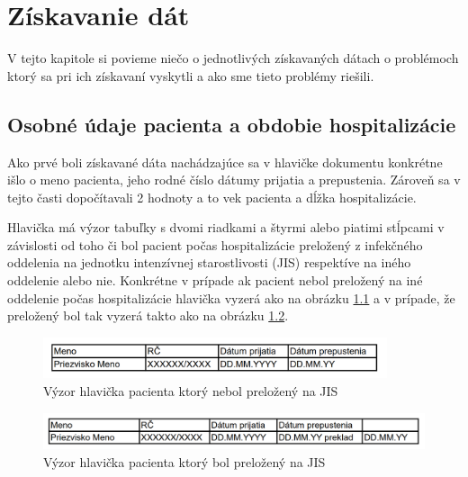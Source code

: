 \chapter{Získavanie dát}

V tejto kapitole si povieme niečo o jednotlivých získavaných dátach o problémoch ktorý sa pri ich získavaní vyskytli a ako sme tieto problémy riešili.

\section{Osobné údaje pacienta a obdobie hospitalizácie}

Ako prvé boli získavané dáta nachádzajúce sa v hlavičke dokumentu konkrétne išlo o meno pacienta, jeho rodné číslo dátumy prijatia a prepustenia. Zároveň sa v tejto časti dopočítavali 2 hodnoty a to vek pacienta a dĺžka hospitalizácie.

Hlavička má výzor tabuľky s dvomi riadkami a štyrmi alebo piatimi stĺpcami v závislosti od toho či bol pacient počas hospitalizácie preložený z infekčného oddelenia na jednotku intenzívnej starostlivosti (JIS) respektíve na iného oddelenie alebo nie. Konkrétne v prípade ak pacient nebol preložený na iné oddelenie počas hospitalizácie hlavička vyzerá ako na obrázku \ref{obr:hlav_a} a v prípade, že preložený bol tak vyzerá takto ako na obrázku \ref{obr:hlav_b}.  

\begin{figure}
	\centerline{\includegraphics[width=0.9\textwidth]{images/hlavicka_a}}
	\caption[Hlavička a)]{Výzor hlavička pacienta ktorý nebol preložený na JIS}
	\label{obr:hlav_a}
\end{figure}

\begin{figure}
	\centerline{\includegraphics[width=1\textwidth]{images/hlavicka_b}}
	\caption[Hlavička b)]{Výzor hlavička pacienta ktorý bol preložený na JIS}
	\label{obr:hlav_b}
\end{figure}

